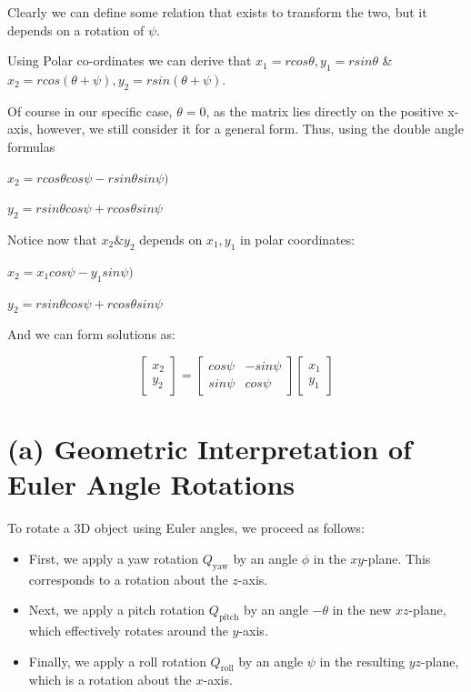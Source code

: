\documentclass[12pt]{article}
\begin{document}
Clearly we can define some relation that exists to transform the two, but it depends on a rotation of $\psi$.\newline

Using Polar co-ordinates we can derive that $x_1 = rcos\theta, y_1 = rsin\theta$ \& \newline$x_2 = rcos(\theta + \psi), y_2 = rsin(\theta + \psi)$. \newline

Of course in our specific case, $\theta = 0$, as the matrix lies directly on the positive x-axis, however, we still consider it for a general form. Thus, using the double angle formulas\newline

$x_2 = rcos\theta cos\psi - rsin\theta sin\psi)$\newline

$y_2 = rsin\theta cos\psi + rcos\theta sin\psi$\newline

Notice now that $x_2 \& y_2$ depends on $x_1, y_1$ in polar coordinates:

$x_2 = x_1cos\psi - y_1sin\psi)$\newline

$y_2 = rsin\theta cos\psi + rcos\theta sin\psi$\newline

And we can form solutions as:

\[\begin{bmatrix}
    x_2 \\ y_2
\end{bmatrix} = \begin{bmatrix}
    cos\psi & -sin\psi \\ sin\psi & cos\psi
\end{bmatrix}\begin{bmatrix}
    x_1 \\ y_1
\end{bmatrix}\]





\section*{(a) Geometric Interpretation of Euler Angle Rotations}

To rotate a 3D object using Euler angles, we proceed as follows:

\begin{itemize}
    \item First, we apply a yaw rotation $Q_{\text{yaw}}$ by an angle $\phi$ in the $xy$-plane. This corresponds to a rotation about the $z$-axis.
    \item Next, we apply a pitch rotation $Q_{\text{pitch}}$ by an angle $-\theta$ in the new $xz$-plane, which effectively rotates around the $y$-axis.
    \item Finally, we apply a roll rotation $Q_{\text{roll}}$ by an angle $\psi$ in the resulting $yz$-plane, which is a rotation about the $x$-axis.
\end{itemize}
\end{document}
